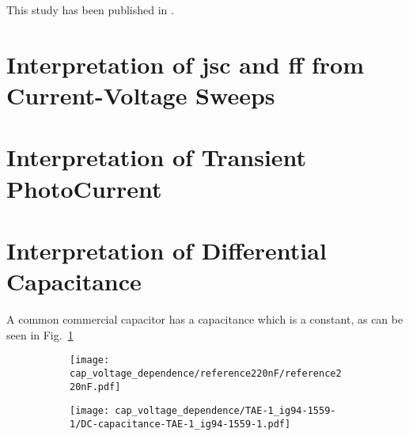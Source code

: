 

 This study has been published in .

\section{Interpretation of \gls{jsc} and \gls{ff} from Current-Voltage Sweeps}

\section{Interpretation of Transient PhotoCurrent}\label{interpretation_tpc}

\section{Interpretation of Differential Capacitance}\label{interpretation_dc}

A common commercial capacitor has a capacitance which is a constant, as can be seen in Fig.~\ref{fig:cap_voltage_dependence_commercial}

\begin{figure}%
	\centering
	\begin{subfigure}[t]{0.45\textwidth}
		\texttt{[image: cap\_voltage\_dependence/reference220nF/reference220nF.pdf]}
		\label{fig:cap_voltage_dependence_commercial}
	\end{subfigure}
	\qquad
	\begin{subfigure}[t]{0.45\textwidth}
		\texttt{[image: cap\_voltage\_dependence/TAE-1\_ig94-1559-1/DC-capacitance-TAE-1\_ig94-1559-1.pdf]}
		\label{fig:cap_voltage_dependence_tae1}
	\end{subfigure}
	\label{fig:cap_voltage_dependence}
\end{figure}

